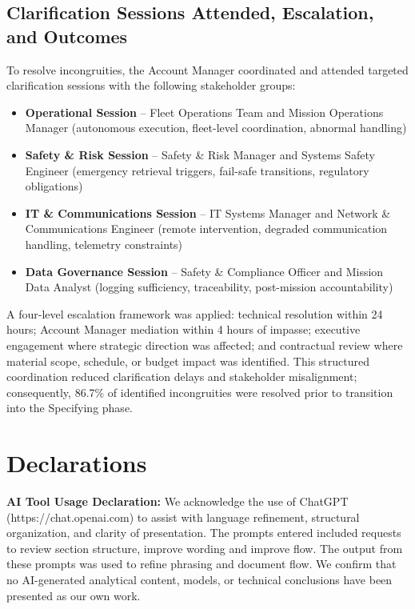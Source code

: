 \documentclass[11pt,a4paper]{article}
\begin{document}
\subsection{Clarification Sessions Attended, Escalation, and Outcomes}

To resolve incongruities, the Account Manager coordinated and attended targeted clarification sessions with the following stakeholder groups:

\begin{itemize}
    \item \textbf{Operational Session} -- Fleet Operations Team and Mission Operations Manager (autonomous execution, fleet-level coordination, abnormal handling)
    \item \textbf{Safety \& Risk Session} -- Safety \& Risk Manager and Systems Safety Engineer (emergency retrieval triggers, fail-safe transitions, regulatory obligations)
    \item \textbf{IT \& Communications Session} -- IT Systems Manager and Network \& Communications Engineer (remote intervention, degraded communication handling, telemetry constraints)
    \item \textbf{Data Governance Session} -- Safety \& Compliance Officer and Mission Data Analyst (logging sufficiency, traceability, post-mission accountability)
\end{itemize}

A four-level escalation framework was applied: technical resolution within 24 hours; Account Manager mediation within 4 hours of impasse; executive engagement where strategic direction was affected; and contractual review where material scope, schedule, or budget impact was identified. This structured coordination reduced clarification delays and stakeholder misalignment; consequently, 86.7\% of identified incongruities were resolved prior to transition into the Specifying phase.

\section{Declarations}
\label{sec:declarations}

\textbf{AI Tool Usage Declaration:} We acknowledge the use of ChatGPT (https://chat.openai.com) to assist with language refinement, structural organization, and clarity of presentation. The prompts entered included requests to review section structure, improve wording and improve flow. The output from these prompts was used to refine phrasing and document flow. We confirm that no AI-generated analytical content, models, or technical conclusions have been presented as our own work.
\end{document}
